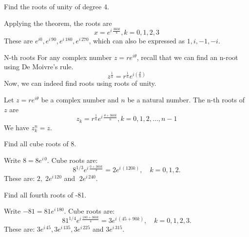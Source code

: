 \begin{frame}[t]
\begin{ex}
Find the roots of unity of degree 4.
\end{ex}
\begin{sol}
Applying the theorem, the roots are
\[x = e^{i \,\frac{360k}{4}}, k=0,1,2,3\]
These are $e^{i0}, e^{i \, 90}, e^{i \, 180}, e^{i \, 270}$, which can also be expressed as $1, i, -1, -i$.
\end{sol}
\end{frame}


\begin{frame}{N-th roots}
For any complex number $z = re^{i\theta}$, recall that we can find an n-root using De Moivre's rule.
\[ z^{\frac{1}{n}} = r^{\frac{1}{n}} e^{i \left(\frac{\theta}{n}\right)}\]
Now, we can indeed find  roots using roots of unity.
\begin{thm}{}{}
Let $z=re^{i\theta}$ be a complex number and $n$ be a natural number. The n-th roots of $z$ are
\begin{equation}
z_k = r^{\frac{1}{n}} e^{i \,\frac{\theta + 360k}{n}}, k=0,1,2,\ldots,n-1
\end{equation}
We have $z_k^n = z$.
\end{thm}
\end{frame}

\begin{frame}[t]
\begin{ex}
Find all cube roots of 8.
\end{ex}
\begin{sol}
Write $8 = 8 e^{i \,0}$. Cube roots are:
\[ 8^{1/3} e^{i \, \frac{0 + 360k}{3}} = 2 e^{i \, (120 k)},\quad k=0,1,2. \]
These are: $2,\; 2e^{i \, 120}$ and $\; 2e^{i \, 240}.$
\end{sol}
\end{frame}

\begin{frame}[t]
\begin{ex}
Find all fourth roots of -81.
\end{ex}
\begin{sol}
Write $-81 = 81 e^{i \,180}$. Cube roots are:
\[ 81^{1/4} e^{i \, \frac{180 + 360k}{4}} = 3 e^{i \, (45 + 90k)},\quad k=0,1,2,3. \]
These are: $3 e^{i \, 45}, 3e^{i \, 135}, 3e^{i\, 225}$ and $3e^{i \, 315}.$
\end{sol}
\end{frame}
